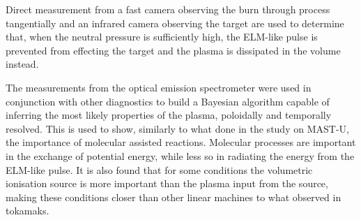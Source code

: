 Direct measurement from a fast camera observing the burn through process tangentially and an infrared camera observing the target are used to determine that, when the neutral pressure is sufficiently high, the ELM-like pulse is prevented from effecting the target and the plasma is dissipated in the volume instead.

The measurements from the optical emission spectrometer were used in conjunction with other diagnostics to build a Bayesian algorithm capable of inferring the most likely properties of the plasma, poloidally and temporally resolved. This is used to show, similarly to what done in the study on MAST-U, the importance of molecular assisted reactions. Molecular processes are important in the exchange of potential energy, while less so in radiating the energy from the ELM-like pulse. It is also found that for some conditions the volumetric ionisation source is more important than the plasma input from the source, making these conditions closer than other linear machines to what observed in tokamaks.


